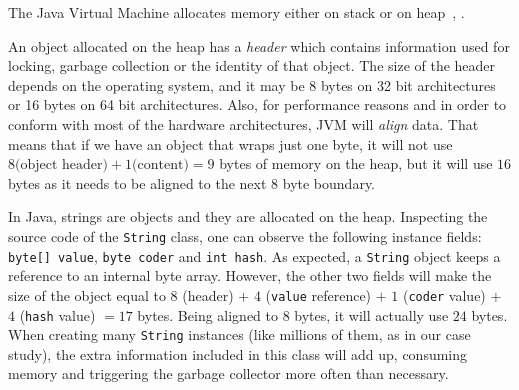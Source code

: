 \documentclass[a4paper,twoside]{article}
\begin{document}
The Java Virtual Machine allocates memory either on stack or on heap~\cite{lindholm:2014}, \cite{gosling:2014}.

An object allocated on the heap has a {\textit{header}} which contains information used for locking, garbage collection or the identity of that object.
The size of the header depends on the operating system, and it may be 8 bytes on 32 bit architectures or 16 bytes on 64 bit architectures.
Also, for performance reasons and in order to conform with most of the hardware architectures, JVM will {\textit{align}} data.
That means that if we have an object that wraps just one byte, it will not use $8 \text{(object header)} + 1 \text{(content)} = 9 $ bytes of memory on the heap, but it will use $16$ bytes as it needs to be aligned to the next $8$ byte boundary.

In Java, strings are objects and they are allocated on the heap.
Inspecting the source code of the \texttt{String} class, one can observe the following instance fields:
{\tt byte[] value}, {\tt byte coder} and  {\tt int hash}.
As expected, a \texttt{String} object keeps a reference to an internal byte array.
However, the other two fields will make the size of the object equal to $8$ (header) $+$ $4$ (\texttt{value} reference) $+$ $1$  (\texttt{coder} value) $+$ $4$ (\texttt{hash} value) $= 17$ bytes.
Being aligned to $8$ bytes, it will actually use $24$ bytes.
When creating many \texttt{String} instances (like millions of them, as in our case study), the extra information included in this class will add up, consuming memory and  triggering the garbage collector more often than necessary. 
\end{document}
